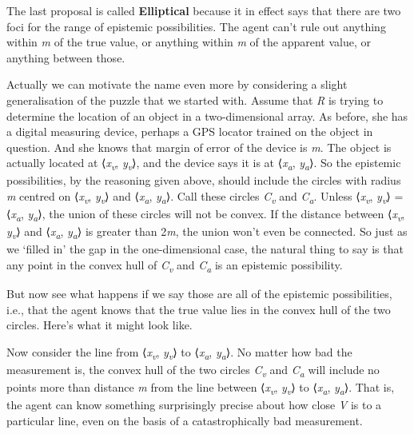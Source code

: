 \documentclass[
  11pt,
  letterpaper,
  DIV=11,
  numbers=noendperiod,
  twoside]{scrartcl}
\begin{document}
The last proposal is called \textbf{Elliptical} because it in effect
says that there are two foci for the range of epistemic possibilities.
The agent can't rule out anything within \emph{m} of the true value, or
anything within \emph{m} of the apparent value, or anything between
those.

Actually we can motivate the name even more by considering a slight
generalisation of the puzzle that we started with. Assume that \emph{R}
is trying to determine the location of an object in a two-dimensional
array. As before, she has a digital measuring device, perhaps a GPS
locator trained on the object in question. And she knows that margin of
error of the device is \emph{m}. The object is actually located at
⟨\emph{x\textsubscript{v}}, \emph{y\textsubscript{v}}⟩, and the device
says it is at ⟨\emph{x\textsubscript{a}}, \emph{y\textsubscript{a}}⟩. So
the epistemic possibilities, by the reasoning given above, should
include the circles with radius \emph{m} centred on
⟨\emph{x\textsubscript{v}}, \emph{y\textsubscript{v}}⟩ and
⟨\emph{x\textsubscript{a}}, \emph{y\textsubscript{a}}⟩. Call these
circles \emph{C\textsubscript{v}} and \emph{C\textsubscript{a}}. Unless
⟨\emph{x\textsubscript{v}}, \emph{y\textsubscript{v}}⟩ =
⟨\emph{x\textsubscript{a}}, \emph{y\textsubscript{a}}⟩, the union of
these circles will not be convex. If the distance between
⟨\emph{x\textsubscript{v}}, \emph{y\textsubscript{v}}⟩ and
⟨\emph{x\textsubscript{a}}, \emph{y\textsubscript{a}}⟩ is greater than
2\emph{m}, the union won't even be connected. So just as we `filled in'
the gap in the one-dimensional case, the natural thing to say is that
any point in the convex hull of \emph{C\textsubscript{v}} and
\emph{C\textsubscript{a}} is an epistemic possibility.

But now see what happens if we say those are all of the epistemic
possibilities, i.e., that the agent knows that the true value lies in
the convex hull of the two circles. Here's what it might look like.

Now consider the line from ⟨\emph{x\textsubscript{v}},
\emph{y\textsubscript{v}}⟩ to ⟨\emph{x\textsubscript{a}},
\emph{y\textsubscript{a}}⟩. No matter how bad the measurement is, the
convex hull of the two circles \emph{C\textsubscript{v}} and
\emph{C\textsubscript{a}} will include no points more than distance
\emph{m} from the line between ⟨\emph{x\textsubscript{v}},
\emph{y\textsubscript{v}}⟩ to ⟨\emph{x\textsubscript{a}},
\emph{y\textsubscript{a}}⟩. That is, the agent can know something
surprisingly precise about how close \emph{V} is to a particular line,
even on the basis of a catastrophically bad measurement.
\end{document}
